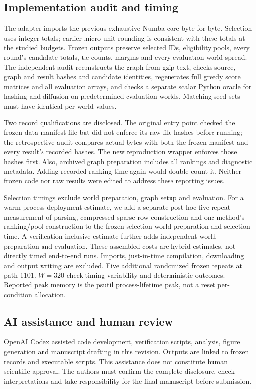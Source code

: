 \documentclass[smallextended]{svjour3}
\begin{document}
\subsection{Implementation audit and timing}
The adapter imports the previous exhaustive Numba core byte-for-byte. Selection uses integer totals; earlier micro-unit rounding is consistent with these totals at the studied budgets. Frozen outputs preserve selected IDs, eligibility pools, every round's candidate totals, tie counts, margins and every evaluation-world spread. The independent audit reconstructs the graph from gzip text, checks source, graph and result hashes and candidate identities, regenerates full greedy score matrices and all evaluation arrays, and checks a separate scalar Python oracle for hashing and diffusion on predetermined evaluation worlds. Matching seed sets must have identical per-world values.

Two record qualifications are disclosed. The original entry point checked the frozen data-manifest file but did not enforce its raw-file hashes before running; the retrospective audit compares actual bytes with both the frozen manifest and every result's recorded hashes. The new reproduction wrapper enforces those hashes first. Also, archived graph preparation includes all rankings and diagnostic metadata. Adding recorded ranking time again would double count it. Neither frozen code nor raw results were edited to address these reporting issues.

Selection timings exclude world preparation, graph setup and evaluation. For a warm-process deployment estimate, we add a separate post-hoc five-repeat measurement of parsing, compressed-sparse-row construction and one method's ranking/pool construction to the frozen selection-world preparation and selection time. A verification-inclusive estimate further adds independent-world preparation and evaluation. These assembled costs are hybrid estimates, not directly timed end-to-end runs. Imports, just-in-time compilation, downloading and output writing are excluded. Five additional randomized frozen repeats at path 1101, $W=320$ check timing variability and deterministic outcomes. Reported peak memory is the psutil process-lifetime peak, not a reset per-condition allocation.

\subsection{AI assistance and human review}
OpenAI Codex assisted code development, verification scripts, analysis, figure generation and manuscript drafting in this revision. Outputs are linked to frozen records and executable scripts. This assistance does not constitute human scientific approval. The authors must confirm the complete disclosure, check interpretations and take responsibility for the final manuscript before submission.
\end{document}
